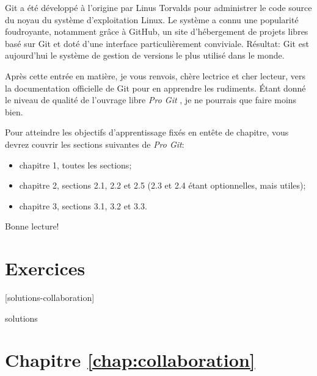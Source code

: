 Git a été développé à l'origine par Linus Torvalds pour administrer le
code source du noyau du système d'exploitation Linux. Le système a
connu une popularité foudroyante, notamment grâce à GitHub, un site
d'hébergement de projets libres basé sur Git et doté d'une interface
particulièrement conviviale. Résultat: Git est aujourd'hui le système
de gestion de versions le plus utilisé dans le monde.

Après cette entrée en matière, je vous renvois, chère lectrice et cher
lecteur, vers la documentation officielle de Git pour en apprendre les
rudiments. Étant donné le niveau de qualité de l'ouvrage libre
\emph{Pro Git} \citep{ProGit:2e:2014}, je ne pourrais que faire moins
bien.

Pour atteindre les objectifs d'apprentissage fixés en entête de
chapitre, vous devrez couvrir les sections suivantes de \emph{Pro Git}:
\begin{itemize}
\item chapitre 1, toutes les sections;
\item chapitre 2, sections 2.1, 2.2 et 2.5 (2.3 et 2.4 étant
  optionnelles, mais utiles);
\item chapitre 3, sections 3.1, 3.2 et 3.3.
\end{itemize}

Bonne lecture!



% 


\section{Exercices}
\label{sec:collaboration:exercices}

[solutions-collaboration]

\begin{Filesave}{solutions}
\section*{Chapitre \ref*{chap:collaboration}}

\end{Filesave}

